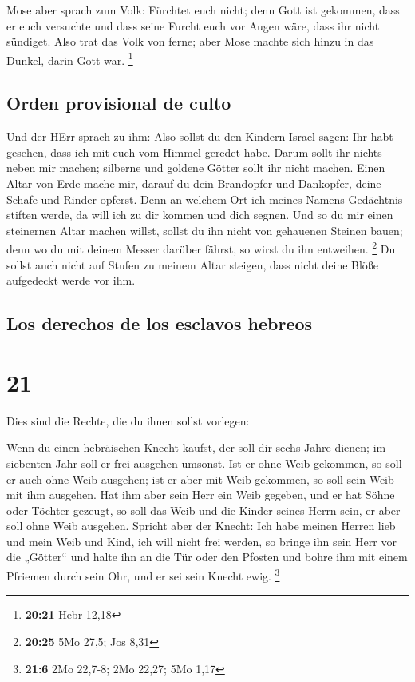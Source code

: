  Mose aber sprach zum Volk: Fürchtet euch nicht; denn
Gott ist gekommen, dass er euch versuchte und dass seine Furcht euch vor
Augen wäre, dass ihr nicht sündiget.  Also trat das Volk
von ferne; aber Mose machte sich hinzu in das Dunkel, darin Gott war.
\footnote{\textbf{20:21} Hebr 12,18}

\hypertarget{orden-provisional-de-culto}{%
\subsection{Orden provisional de
culto}\label{orden-provisional-de-culto}}

 Und der HErr sprach zu ihm: Also sollst du den Kindern
Israel sagen: Ihr habt gesehen, dass ich mit euch vom Himmel geredet
habe.  Darum sollt ihr nichts neben mir machen; silberne
und goldene Götter sollt ihr nicht machen.  Einen Altar
von Erde mache mir, darauf du dein Brandopfer und Dankopfer, deine
Schafe und Rinder opferst. Denn an welchem Ort ich meines Namens
Gedächtnis stiften werde, da will ich zu dir kommen und dich segnen.
 Und so du mir einen steinernen Altar machen willst,
sollst du ihn nicht von gehauenen Steinen bauen; denn wo du mit deinem
Messer darüber fährst, so wirst du ihn entweihen. \footnote{\textbf{20:25}
  5Mo 27,5; Jos 8,31}  Du sollst auch nicht auf Stufen zu
meinem Altar steigen, dass nicht deine Blöße aufgedeckt werde vor ihm.

\hypertarget{los-derechos-de-los-esclavos-hebreos}{%
\subsection{Los derechos de los esclavos
hebreos}\label{los-derechos-de-los-esclavos-hebreos}}

\hypertarget{section-20}{%
\section{21}\label{section-20}}

 Dies sind die Rechte, die du ihnen sollst vorlegen:

 Wenn du einen hebräischen Knecht kaufst, der soll dir
sechs Jahre dienen; im siebenten Jahr soll er frei ausgehen umsonst.
 Ist er ohne Weib gekommen, so soll er auch ohne Weib
ausgehen; ist er aber mit Weib gekommen, so soll sein Weib mit ihm
ausgehen.  Hat ihm aber sein Herr ein Weib gegeben, und er
hat Söhne oder Töchter gezeugt, so soll das Weib und die Kinder seines
Herrn sein, er aber soll ohne Weib ausgehen.  Spricht aber
der Knecht: Ich habe meinen Herren lieb und mein Weib und Kind, ich will
nicht frei werden,  so bringe ihn sein Herr vor die
„Götter`` und halte ihn an die Tür oder den Pfosten und bohre ihm mit
einem Pfriemen durch sein Ohr, und er sei sein Knecht ewig. \footnote{\textbf{21:6}
  2Mo 22,7-8; 2Mo 22,27; 5Mo 1,17}

